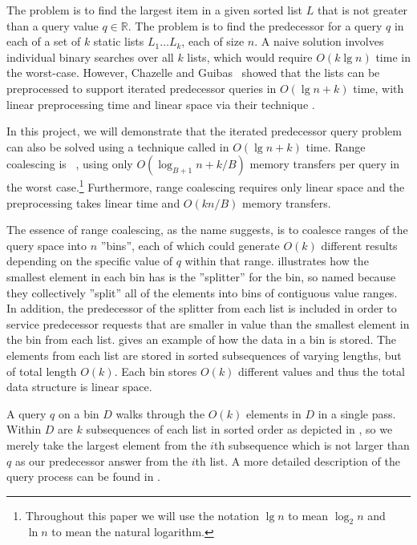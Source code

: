 
The  problem is to find the largest item in a given sorted list $L$
that is not greater than a query value $q \in \mathbb{R}$.  The  
problem is to find the predecessor for a query $q$ in each of a set of $k$ static lists
$L_1 \ldots L_k$, each of size $n$.  A naive solution involves individual binary searches over all
$k$ lists, which would require $O(k \lg n)$ time in the worst-case.  However, Chazelle
and Guibas~\cite{ChazelleGu86a} showed that the lists can be 
preprocessed to support iterated predecessor queries in $O(\lg n + k)$ time, with
linear preprocessing time and linear space via their technique .

In this project, we will demonstrate that the iterated predecessor query problem
can also be solved using a technique called  in $O(\lg n + k)$ time.
Range coalescing is ~\cite{FrigoLePr99}, using only 
$O(\log_{B+1} n + k/B)$ memory transfers per query in the worst case.\footnote{Throughout 
this paper we will use the notation $\lg n$ to mean $\log_2 n$ and $\ln n$ to 
mean the natural logarithm.}  Furthermore, range coalescing requires
only linear space and the preprocessing takes linear time and $O(kn/B)$ memory
transfers.

The essence of range coalescing, as the name suggests, is to coalesce ranges of 
the query space into $n$ ''bins'', each of which could generate $O(k)$ different results
depending on the specific value of $q$ within that range.
 illustrates how the smallest element in each bin has 
is the ''splitter'' for the bin, so named because they collectively ''split'' all
of the elements into bins of contiguous value ranges.  In addition,
the predecessor of the splitter from each list is included in order to
service predecessor requests that are smaller in value than the smallest element
in the bin from each list.   gives an example of how the data
in a bin is stored.  The elements from each list are stored in sorted subsequences of
varying lengths, but of total length $O(k)$. Each bin stores $O(k)$ different 
values and thus the total data structure is linear space.

A query $q$ on a bin $D$ walks through the $O(k)$ elements in $D$ in a single pass.
Within $D$ are $k$ subsequences of each list in sorted order as depicted in 
, so we merely take the
largest element from the $i$th subsequence which is not larger than $q$ as our predecessor
answer from the $i$th list.  A more detailed description of the query process can
be found in .

